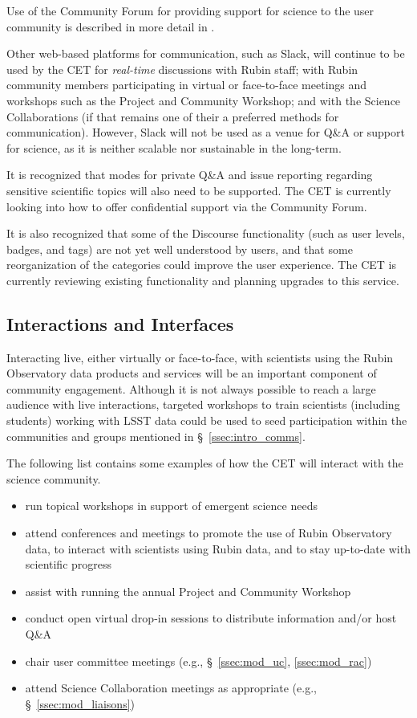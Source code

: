 \documentclass[DM,lsstdraft,toc]{lsstdoc}
\begin{document}
Use of the Community Forum for providing support for science to the user community is described in more detail in .

Other web-based platforms for communication, such as Slack, will continue to be used by the CET for \textit{real-time} discussions with Rubin staff; with Rubin community members participating in virtual or face-to-face meetings and workshops such as the Project and Community Workshop; and with the Science Collaborations (if that remains one of their a preferred methods for communication).
However, Slack will not be used as a venue for Q\&A or support for science, as it is neither scalable nor sustainable in the long-term.

It is recognized that modes for private Q\&A and issue reporting regarding sensitive scientific topics will also need to be supported.
The CET is currently looking into how to offer confidential support via the Community Forum.

It is also recognized that some of the Discourse functionality (such as user levels, badges, and tags) are not yet well understood by users, and that some reorganization of the categories could improve the user experience.
The CET is currently reviewing existing functionality and planning upgrades to this service.


\subsection{Interactions and Interfaces}\label{ssec:mod_interface}

Interacting live, either virtually or face-to-face, with scientists using the Rubin Observatory data products and services will be an important component of community engagement.
Although it is not always possible to reach a large audience with live interactions, targeted workshops to train scientists (including students) working with LSST data could be used to seed participation within the communities and groups mentioned in \S~\ref{ssec:intro_comms}.

The following list contains some examples of how the CET will interact with the science community.
\begin{itemize}
\item run topical workshops in support of emergent science needs
\item attend conferences and meetings to promote the use of Rubin Observatory data, to interact with scientists using Rubin data, and to stay up-to-date with scientific progress
\item assist with running the annual Project and Community Workshop
\item conduct open virtual drop-in sessions to distribute information and/or host Q\&A 
\item chair user committee meetings (e.g., \S~\ref{ssec:mod_uc}, \ref{ssec:mod_rac})
\item attend Science Collaboration meetings as appropriate (e.g., \S~\ref{ssec:mod_liaisons})
\end{itemize}
\end{document}

